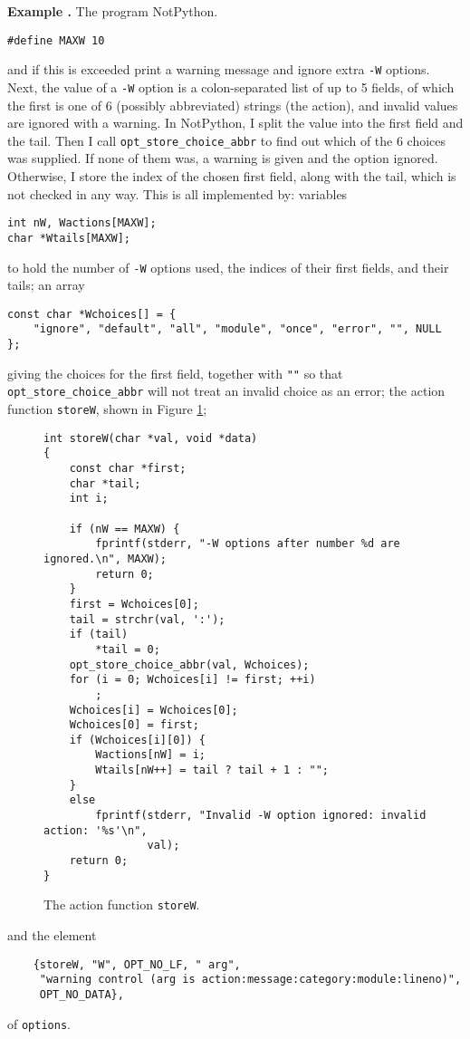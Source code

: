 \documentclass{article}
\newcounter{exnum}
\newenvironment{example}[1]
{\par\smallskip\noindent\refstepcounter{exnum}\textbf{Example
    \theexnum.} The program #1.\par\nopagebreak}
{\par\smallskip}
\renewcommand{\tt}{\texttt}
\begin{document}
\begin{example}{NotPython}
{\small
\begin{verbatim}
#define MAXW 10
\end{verbatim}}
  \noindent and if this is exceeded print a warning message and ignore
  extra \tt{-W} options. Next, the value of a \tt{-W} option is a
  colon-separated list of up to 5 fields, of which the first is one of
  6 (possibly abbreviated) strings (the action), and invalid values
  are ignored with a warning. In NotPython, I split the value into the
  first field and the tail. Then I call \tt{opt\_store\_choice\_abbr}
  to find out which of the 6 choices was supplied. If none of them
  was, a warning is given and the option ignored. Otherwise, I store
  the index of the chosen first field, along with the tail, which is
  not checked in any way. This is all implemented by: variables
{\small
\begin{verbatim}
int nW, Wactions[MAXW];
char *Wtails[MAXW];
\end{verbatim}}
  \noindent to hold the number of \tt{-W} options used, the indices of
  their first fields, and their tails; an array
{\small
\begin{verbatim}
const char *Wchoices[] = {
    "ignore", "default", "all", "module", "once", "error", "", NULL
};
\end{verbatim}}
  \noindent giving the choices for the first field, together with
  \tt{""} so that \tt{opt\_store\_choice\_abbr} will not treat an
  invalid choice as an error; the action function \tt{storeW}, shown
  in Figure \ref{fig:storeW};
  \begin{figure}\small
\begin{verbatim}
int storeW(char *val, void *data)
{
    const char *first;
    char *tail;
    int i;

    if (nW == MAXW) {
        fprintf(stderr, "-W options after number %d are ignored.\n", MAXW);
        return 0;
    }
    first = Wchoices[0];
    tail = strchr(val, ':');
    if (tail)
        *tail = 0;
    opt_store_choice_abbr(val, Wchoices);
    for (i = 0; Wchoices[i] != first; ++i)
        ;
    Wchoices[i] = Wchoices[0];
    Wchoices[0] = first;
    if (Wchoices[i][0]) {
        Wactions[nW] = i;
        Wtails[nW++] = tail ? tail + 1 : "";
    }
    else 
        fprintf(stderr, "Invalid -W option ignored: invalid action: '%s'\n",
                val);
    return 0;
}
\end{verbatim}
    \caption{The action function \tt{storeW}.}
    \label{fig:storeW}
  \end{figure}
  and the element
{\small
\begin{verbatim}
    {storeW, "W", OPT_NO_LF, " arg",
     "warning control (arg is action:message:category:module:lineno)",
     OPT_NO_DATA},
\end{verbatim}}
  \noindent of \tt{options}. 


\end{example}
\end{document}
